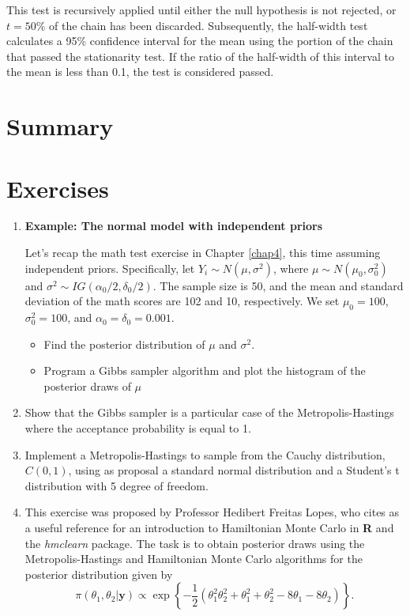This test is recursively applied until either the null hypothesis is not rejected, or $t = 50\%$ of the chain has been discarded. Subsequently, the half-width test calculates a 95\% confidence interval for the mean using the portion of the chain that passed the stationarity test. If the ratio of the half-width of this interval to the mean is less than 0.1, the test is considered passed.\\


\section{Summary}\label{sec55}


\section{Exercises}\label{sec56}

\begin{enumerate}
	\item \textbf{Example: The normal model with independent priors}
	
	Let's recap the math test exercise in Chapter \ref{chap4}, this time assuming independent priors. Specifically, let $Y_i \sim N(\mu, \sigma^2)$, where $\mu \sim N(\mu_0, \sigma_0^2)$ and $\sigma^2 \sim IG(\alpha_0 / 2, \delta_0 / 2)$. The sample size is 50, and the mean and standard deviation of the math scores are 102 and 10, respectively. We set $\mu_0 = 100$, $\sigma_0^2 = 100$, and $\alpha_0 = \delta_0 = 0.001$.
	
	\begin{itemize}
		\item Find the posterior distribution of $\mu$ and $\sigma^2$.
		\item Program a Gibbs sampler algorithm and plot the histogram of the posterior draws of $\mu$
	\end{itemize}

	\item Show that the Gibbs sampler is a particular case of the Metropolis-Hastings where the acceptance probability is equal to 1.
	
	\item Implement a Metropolis-Hastings to sample from the Cauchy distribution, $C(0,1)$, using as proposal a standard normal distribution and a Student's t distribution with 5 degree of freedom.
	
	\item This exercise was proposed by Professor Hedibert Freitas Lopes, who cites \cite{thomas2021learning} as a useful reference for an introduction to Hamiltonian Monte Carlo in \textbf{R} and the \textit{hmclearn} package. The task is to obtain posterior draws using the Metropolis-Hastings and Hamiltonian Monte Carlo algorithms for the posterior distribution given by 
	\[
	\pi(\theta_1,\theta_2|\bm{y}) \propto \exp\left\{-\frac{1}{2}(\theta_1^2\theta_2^2 + \theta_1^2 + \theta_2^2 - 8\theta_1 - 8\theta_2)\right\}.
	\]   
	
\end{enumerate}



